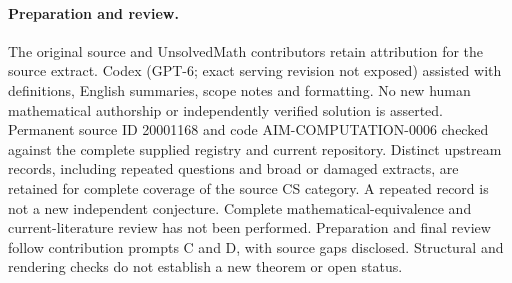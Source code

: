 \documentclass[11pt]{article}
\begin{document}
\paragraph{Preparation and review.}
The original source and UnsolvedMath contributors retain attribution for the source extract. Codex (GPT-6; exact serving revision not exposed) assisted with definitions, English summaries, scope notes and formatting. No new human mathematical authorship or independently verified solution is asserted. Permanent source ID 20001168 and code AIM-COMPUTATION-0006 checked against the complete supplied registry and current repository. Distinct upstream records, including repeated questions and broad or damaged extracts, are retained for complete coverage of the source CS category. A repeated record is not a new independent conjecture. Complete mathematical-equivalence and current-literature review has not been performed. Preparation and final review follow contribution prompts C and D, with source gaps disclosed. Structural and rendering checks do not establish a new theorem or open status.
\label{end:20001168}
\end{document}
